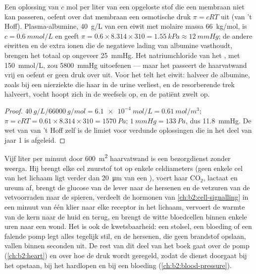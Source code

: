 \begin{theorem}\label{thm:b2:blood-circulation:oncotic}
Een oplossing van $c$ mol per liter van een opgeloste stof die een membraan
niet kan passeren, oefent over dat membraan een osmotische druk
$\pi = cRT$ uit (van 't
Hoff). Plasma-albumine, \qty{40}{g/L} van een eiwit met molaire massa
\qty{66}{kg/mol}, is $c = \qty{0.6}{mmol/L}$ en geeft $\pi =
0.6\times 8.314\times 310 = \qty{1.55}{kPa} \approx \qty{12}{mmHg}$;
de andere eiwitten en de extra ionen die de negatieve lading van albumine
vasthoudt, brengen het totaal op ongeveer \qty{25}{mmHg}. Het
natriumchloride van het , met \qty{150}{mmol/L}, zou
\qty{5800}{mmHg} uitoefenen --- maar het passeert de haarvatwand vrij en
oefent er geen druk over uit. Voor het  telt het eiwit: halveer de
albumine, zoals bij een nierziekte die haar in de urine verliest, en de
resorberende trek halveert, vocht hoopt zich in de weefsels op, en de
patiënt zwelt op.
\end{theorem}
\begin{proof}
$\qty{40}{g/L}/\qty{66000}{g/mol} = \qty{6.1e-4}{mol/L} =
\qty{0.61}{mol/m^3}$; $\pi = cRT = 0.61\times 8.314\times 310 =
\qty{1570}{Pa}$; $\qty{1}{mmHg} = \qty{133}{Pa}$, dus \qty{11.8}{mmHg}.
De wet van van 't Hoff zelf is de limiet voor verdunde oplossingen die in
het deel van jaar 1 is afgeleid.
\end{proof}

\begin{example}\label{ex:b2:blood-circulation:transport}
Vijf liter per minuut door \qty{600}{m^2} haarvatwand is een bezorgdienst
zonder weerga. Hij brengt elke cel zuurstof tot op enkele celdiameters
(geen enkele cel van het lichaam ligt verder dan \qty{20}{\micro m} van een
), voert haar $\mathrm{CO_2}$, lactaat en ureum af, brengt de glucose
van de lever naar de hersenen en de vetzuren van de vetvoorraden naar de
spieren, verdeelt de hormonen van \cref{ch:b2:cell-signalling} in een minuut
van één klier naar elke receptor in het lichaam, vervoert de warmte van de
kern naar de huid en terug, en brengt de witte bloedcellen binnen enkele
uren naar een wond. Het is ook de kwetsbaarheid: een stolsel, een bloeding
of een falende pomp legt alles tegelijk stil, en de hersenen, die geen
brandstof opslaan, vallen binnen seconden uit. De rest van dit deel van het
boek gaat over de pomp (\cref{ch:b2:heart}) en over hoe de druk wordt
geregeld, zodat de dienst doorgaat bij het opstaan, bij het hardlopen en bij
een bloeding (\cref{ch:b2:blood-pressure}).
\end{example}

